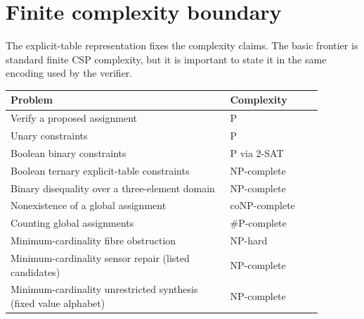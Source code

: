\documentclass[11pt]{article}
\theoremstyle{plain}
\theoremstyle{definition}
\theoremstyle{remark}
\begin{document}
\section{Finite complexity boundary}
\label{sec:complexity}

The explicit-table representation fixes the complexity claims.  The basic
frontier is standard finite CSP complexity, but it is important to state it in
the same encoding used by the verifier.

\begin{center}
\begin{tabular}{@{}p{0.62\linewidth}p{0.26\linewidth}@{}}
\toprule
Problem & Complexity\\
\midrule
Verify a proposed assignment & P\\
Unary constraints & P\\
Boolean binary constraints & P via 2-SAT\\
Boolean ternary explicit-table constraints & NP-complete\\
Binary disequality over a three-element domain & NP-complete\\
Nonexistence of a global assignment & coNP-complete\\
Counting global assignments & \(\#\mathrm P\)-complete\\
Minimum-cardinality fibre obstruction & NP-hard\\
Minimum-cardinality sensor repair (listed candidates) & NP-complete\\
Minimum-cardinality unrestricted synthesis (fixed value alphabet) & NP-complete\\
\bottomrule
\end{tabular}
\end{center}
\end{document}
